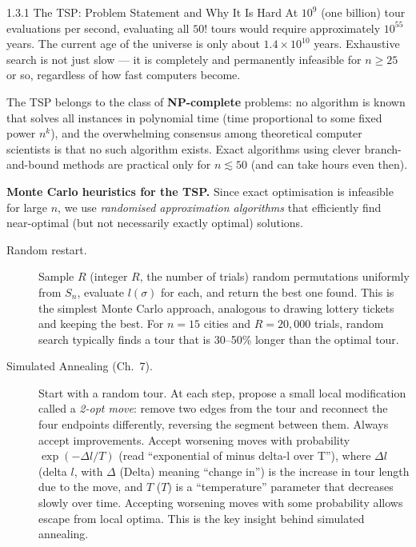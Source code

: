 \documentclass[aspectratio=169,10pt]{beamer}
\begin{document}
\begin{frame}[allowframebreaks]{1.3.1 The TSP: Problem Statement and Why It Is Hard}
  At $10^9$ (one billion) tour evaluations per second, evaluating all $50!$
  tours would require approximately $10^{55}$ years.  The current age of the
  universe is only about $1.4 \times 10^{10}$ years.  Exhaustive search is not
  just slow --- it is completely and permanently infeasible for $n \ge 25$ or
  so, regardless of how fast computers become.

  The TSP belongs to the class of \textbf{NP-complete} problems: no algorithm
  is known that solves all instances in polynomial time (time proportional to
  some fixed power $n^k$), and the overwhelming consensus among theoretical
  computer scientists is that no such algorithm exists.  Exact algorithms using
  clever branch-and-bound methods are practical only for $n \lesssim 50$ (and
  can take hours even then).

  \framebreak

  \textbf{Monte Carlo heuristics for the TSP.}  Since exact optimisation is
  infeasible for large $n$, we use \emph{randomised approximation algorithms}
  that efficiently find near-optimal (but not necessarily exactly optimal)
  solutions.

  \begin{description}
    \item[Random restart.] Sample $R$ (integer $R$, the number of trials)
      random permutations uniformly from $S_n$, evaluate $l(\sigma)$ for each,
      and return the best one found.  This is the simplest Monte Carlo approach,
      analogous to drawing lottery tickets and keeping the best.  For $n = 15$
      cities and $R = 20{,}000$ trials, random search typically finds a tour
      that is 30--50\% longer than the optimal tour.

    \item[Simulated Annealing (Ch.~7).] Start with a random tour.  At each
      step, propose a small local modification called a \emph{2-opt move}:
      remove two edges from the tour and reconnect the four endpoints
      differently, reversing the segment between them.  Always accept
      improvements.  Accept worsening moves with probability
      $\exp(-\Delta l / T)$ (read ``exponential of minus delta-l over T''),
      where $\Delta l$ (delta $l$, with $\Delta$ (Delta) meaning ``change in'')
      is the increase in tour length due to the move, and $T$ ($T$) is a
      ``temperature'' parameter that decreases slowly over time.  Accepting
      worsening moves with some probability allows escape from local optima.
      This is the key insight behind simulated annealing.


\end{description}
\end{frame}
\end{document}

